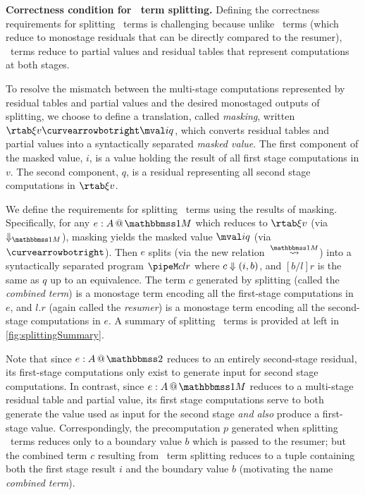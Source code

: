 \begin{abstrsyn}
\textbf{Correctness condition for \bbonem\ term splitting.} Defining
the correctness requirements for splitting \bbonem\ terms is
challenging because unlike \bbtwo\ terms (which reduce to monostage
residuals that can be directly compared to the resumer),
\bbonem\ terms reduce to partial values and residual tables that
represent computations at both stages.

To resolve the mismatch between the multi-stage computations
represented by residual tables and partial values and the desired
monostaged outputs of splitting, we choose to define a translation,
called {\em masking}, written $\rtab \xi v \vsplito \mval i q$, which
converts residual tables and partial values into a syntactically
separated {\em masked value}.  The first component of the masked
value, $i$, is a value holding the result of all first stage
computations in $v$.  The second component, $q$, is a residual
representing all second stage computations in $\rtab \xi v$.

We define the requirements for splitting \bbonem\ terms using the
results of masking. Specifically, for any $\colmix e A$ which reduces
to $\rtab \xi v$ (via $\redonesym$), masking yields the masked value
$\mval i q$ (via~$\vsplito$).  Then $e$ splits (via the new
relation~$\splitonesym$) into a syntactically separated program
$\pipeM c l r$ where ${c} \Downarrow {(}i,b)$, and $[b/l]r$ is the same as
$q$ up to an equivalence.  The term $c$ generated by splitting (called
the {\em combined term}) is a monostage term encoding all the
first-stage computations in $e$, and $l.r$ (again called the {\em
  resumer}) is a monostage term encoding all the second-stage
computations in $e$.  A summary of splitting \bbonem\ terms is
provided at left in \ref{fig:splittingSummary}.



Note that since $\coltwo e A$ reduces to an entirely second-stage
residual, its first-stage computations only exist to generate input
for second stage computations.  In contrast, since $\colmix e A$
reduces to a multi-stage residual table and partial value, its first
stage computations serve to both generate the value used as input for
the second stage {\em and also} produce a first-stage value.
Correspondingly, the precomputation $p$ generated when splitting
\bbtwo\ terms reduces only to a boundary value $b$ which is passed to
the resumer; but the combined term $c$ resulting from \bbtwo\ term
splitting reduces to a tuple containing both the first stage result
$i$ and the boundary value $b$ (motivating the name {\em combined
term}).


\end{abstrsyn}
